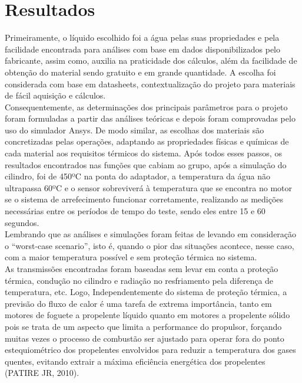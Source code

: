 \section{Resultados}
Primeiramente, o líquido escolhido foi a água pelas suas propriedades e pela facilidade encontrada para análises com base em dados disponibilizados pelo fabricante, assim como, auxilia na praticidade dos cálculos, além da facilidade de obtenção do material sendo gratuito e em grande quantidade. A escolha foi considerada com base em datasheets, contextualização do projeto para materiais de fácil aquisição e cálculos.\\
Consequentemente, as determinações dos principais parâmetros para o projeto foram formuladas a partir das análises teóricas e depois foram comprovadas pelo uso do simulador Ansys. De modo similar, as escolhas dos materiais são concretizadas pelas operações, adaptando as propriedades físicas e químicas de cada material aos requisitos térmicos do sistema.
Após todos esses passos, os resultados encontrados nas funções que cabiam ao grupo, após a simulação do cilindro, foi de 450ºC na ponta do adaptador, a temperatura da água não ultrapassa 60ºC e o sensor sobreviverá à temperatura que se encontra no motor se o sistema de arrefecimento funcionar corretamente, realizando as medições necessárias entre os períodos de tempo do teste, sendo eles entre 15 e 60 segundos.\\ Lembrando que as análises e simulações foram feitas de levando em consideração o “worst-case scenario”, isto é, quando o pior das situações acontece, nesse caso, com a maior temperatura possível e sem proteção térmica no sistema.\\
As transmissões encontradas foram baseadas sem levar em conta a proteção térmica, condução no cilindro e radiação no resfriamento pela diferença de temperatura, etc. Logo, Independentemente do sistema de proteção térmica, a previsão do fluxo de calor é uma tarefa de extrema importância, tanto em motores de foguete a propelente líquido quanto em motores a propelente sólido pois se trata de um aspecto que limita a performance do propulsor, forçando muitas vezes o processo de combustão ser ajustado para operar fora do ponto estequiométrico dos propelentes envolvidos para reduzir a temperatura dos gases quentes, evitando extrair a máxima eficiência energética dos propelentes (PATIRE JR, 2010). 

     
